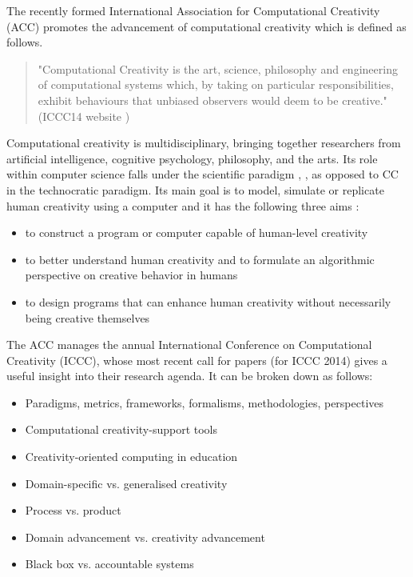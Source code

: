 The recently formed International Association for Computational Creativity (ACC)  promotes the advancement of computational creativity which is defined as follows.

\begin{quote}
  "Computational Creativity is the art, science, philosophy and engineering of computational systems which, by taking on particular responsibilities, exhibit behaviours that unbiased observers would deem to be creative." (ICCC14 website )
\end{quote}

Computational creativity is multidisciplinary, bringing together researchers from artificial intelligence, cognitive psychology, philosophy, and the arts. Its role within computer science falls under the scientific paradigm \citep[p.8]{Hugill2013}, \citep[see also]{Eden2007}, as opposed to CC in the technocratic paradigm. Its main goal is to model, simulate or replicate human creativity using a computer and it has the following three aims :

\begin{itemize}
  \item to construct a program or computer capable of human-level creativity
  \item to better understand human creativity and to formulate an algorithmic perspective on creative behavior in humans
  \item to design programs that can enhance human creativity without necessarily being creative themselves
\end{itemize}

The ACC manages the annual International Conference on Computational Creativity (ICCC), whose most recent call for papers  (for ICCC 2014) gives a useful insight into their research agenda. It can be broken down as follows:

\begin{itemize}
  \item Paradigms, metrics, frameworks, formalisms, methodologies, perspectives
  \item Computational creativity-support tools
  \item Creativity-oriented computing in education
  \item Domain-specific vs. generalised creativity
  \item Process vs. product
  \item Domain advancement vs. creativity advancement
  \item Black box vs. accountable systems
\end{itemize}

